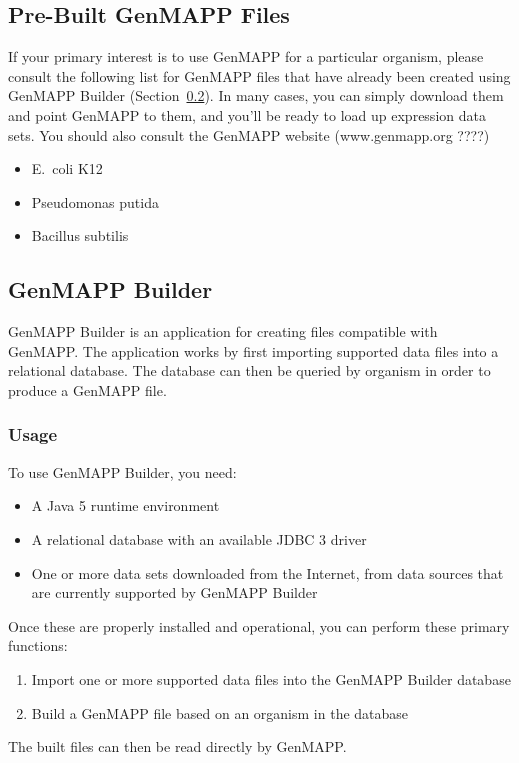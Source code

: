 \documentclass[11pt]{article}
\begin{document}
\subsection{Pre-Built GenMAPP Files}

If your primary interest is to use GenMAPP for a particular organism, please consult the following list for GenMAPP files that have already been created using GenMAPP Builder (Section~\ref{genmappBuilder}).  In many cases, you can simply download them and point GenMAPP to them, and you'll be ready to load up expression data sets. You should also consult the GenMAPP website (www.genmapp.org ????)

\begin{itemize}
\item E.\ coli K12
\item Pseudomonas putida
\item Bacillus subtilis
\end{itemize}

\subsection{GenMAPP Builder}
\label{genmappBuilder}

GenMAPP Builder is an application for creating files compatible with GenMAPP.  The application works by first importing supported data files into a relational database.  The database can then be queried by organism in order to produce a GenMAPP file.

\subsubsection{Usage}

To use GenMAPP Builder, you need:
\begin{itemize}
\item A Java 5 runtime environment
\item A relational database with an available JDBC 3 driver
\item One or more data sets downloaded from the Internet, from data sources that are currently supported by GenMAPP Builder
\end{itemize}
Once these are properly installed and operational, you can perform these primary functions:
\begin{enumerate}
\item Import one or more supported data files into the GenMAPP Builder database
\item Build a GenMAPP file based on an organism in the database
\end{enumerate}
The built files can then be read directly by GenMAPP.
\end{document}
